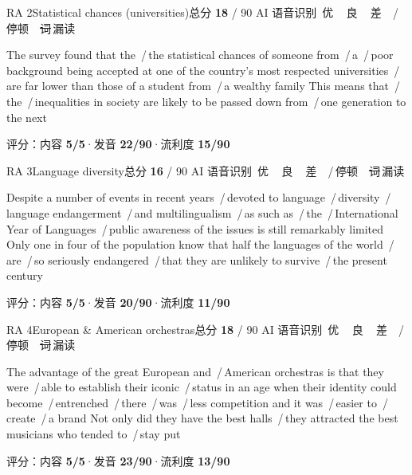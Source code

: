 \documentclass[11pt]{article}
\newcommand{\sfull}[1]{\textcolor{cFix}{\bfseries #1}}     %
\newcommand{\spart}[1]{\textcolor{cPartial}{\bfseries #1}} %
\newcommand{\szero}[1]{\textcolor{cWrong}{\bfseries #1}}   %
\newcommand{\sg}[1]{\textcolor{cSpkGood}{#1}}   %
\newcommand{\sy}[1]{\textcolor{cSpkOk}{#1}}     %
\newcommand{\sr}[1]{\textcolor{cSpkBad}{#1}}    %
\newcommand{\pse}{{\color{gray}\,/\,}}          %
\newcommand{\asrlegend}{{\footnotesize\color{gray}AI 语音识别\quad
  {\color{cSpkGood}\textbullet}\,优\ \ {\color{cSpkOk}\textbullet}\,良\ \
  {\color{cSpkBad}\textbullet}\,差\ \ {\color{gray}/}\,停顿\ \
  {\color{cSpkBad}\sout{词}}\,漏读}}
\begin{document}
\begin{qblock}{RA 2\quad Statistical chances (universities)}{总分 \textcolor{cAccent}{\bfseries 18} / 90}
\asrlegend
\begin{asrbox}
\sg{The survey found that the} \pse \sg{the} \sr{statistical chances} \sg{of someone from} \pse \sy{a} \pse \sy{poor} \sg{background being} \sy{accepted at} \sg{one of the country's most respected universities} \pse \sy{are far} \sg{lower than those of} \sg{a student from} \pse \sg{a wealthy family This means that} \pse \sy{the} \pse \sy{inequalities in society} \sg{are likely to be passed down from} \pse \sg{one generation to the next}
\end{asrbox}
{\small 评分：内容 \sfull{5/5}\quad·\quad 发音 \spart{22/90}\quad·\quad 流利度 \szero{15/90}}
\end{qblock}

\begin{qblock}{RA 3\quad Language diversity}{总分 \textcolor{cAccent}{\bfseries 16} / 90}
\asrlegend
\begin{asrbox}
\sy{Despite a number of events in recent years} \pse \sg{devoted to language} \pse \sy{diversity} \pse \sg{language endangerment} \pse \sy{and multilingualism} \pse \sy{as such as} \pse \sy{the} \pse \sy{International Year of Languages} \pse \sg{public awareness of the issues is still remarkably limited} \sg{Only one in four of the} \sr{population} \sg{know that half the languages of the world} \pse \sy{are} \pse \sy{so seriously endangered} \pse \sg{that they are unlikely to survive} \pse \sy{the present century}
\end{asrbox}
{\small 评分：内容 \sfull{5/5}\quad·\quad 发音 \spart{20/90}\quad·\quad 流利度 \szero{11/90}}
\end{qblock}

\begin{qblock}{RA 4\quad European \& American orchestras}{总分 \textcolor{cAccent}{\bfseries 18} / 90}
\asrlegend
\begin{asrbox}
\sg{The advantage} \sg{of the great} \sy{European} \sy{and} \pse \sy{American orchestras} \sg{is that they were} \pse \sg{able to establish their} \sy{iconic} \pse \sg{status in an age when their identity could become} \pse \sr{entrenched} \pse \sy{there} \pse \sy{was} \pse \sy{less competition} \sg{and it} \sg{was} \pse \sg{easier to} \pse \sy{create} \pse \sy{a brand} \sg{Not only did they} \sg{have the best halls} \pse \sy{they} \sr{attracted} \sg{the best musicians who} \sg{tended to} \pse \sg{stay put}
\end{asrbox}
{\small 评分：内容 \sfull{5/5}\quad·\quad 发音 \spart{23/90}\quad·\quad 流利度 \szero{13/90}}
\end{qblock}
\end{document}
